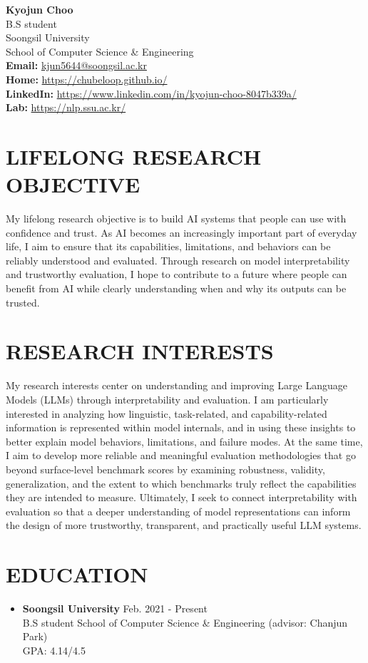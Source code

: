 \documentclass[10pt,a4paper]{article} %
\newcommand{\seclabel}[1]{\section*{\uppercase{#1}}}
\newcommand{\cvitem}[2]{\textbf{#1} \hfill \small{#2}\\}
\begin{document}
\begin{center}
    \textbf{\Huge{Kyojun Choo}} \\ \vspace{1.0em}
    B.S student \\ Soongsil University \\ School of Computer Science \& Engineering \\
    \textbf{Email: }\href{mailto:kjun5644@soongsil.ac.kr}{kjun5644@soongsil.ac.kr} \\
    \textbf{Home: }\url{https://chubeloop.github.io/} \\
    \textbf{LinkedIn: }\url{https://www.linkedin.com/in/kyojun-choo-8047b339a/} \\
    \textbf{Lab: }\url{https://nlp.ssu.ac.kr/}
\end{center}

\vspace{1em}

\seclabel{Lifelong Research Objective}
\small{My lifelong research objective is to build AI systems that people can use with confidence and trust. As AI becomes an increasingly important part of everyday life, I aim to ensure that its capabilities, limitations, and behaviors can be reliably understood and evaluated. Through research on model interpretability and trustworthy evaluation, I hope to contribute to a future where people can benefit from AI while clearly understanding when and why its outputs can be trusted.}

\seclabel{Research Interests}
\small{My research interests center on understanding and improving Large Language Models (LLMs) through interpretability and evaluation. I am particularly interested in analyzing how linguistic, task-related, and capability-related information is represented within model internals, and in using these insights to better explain model behaviors, limitations, and failure modes. At the same time, I aim to develop more reliable and meaningful evaluation methodologies that go beyond surface-level benchmark scores by examining robustness, validity, generalization, and the extent to which benchmarks truly reflect the capabilities they are intended to measure. Ultimately, I seek to connect interpretability with evaluation so that a deeper understanding of model representations can inform the design of more trustworthy, transparent, and practically useful LLM systems.}

\seclabel{Education}
\begin{itemize}[left=0pt]
    \item \cvitem{Soongsil University}{\small{Feb. 2021 - Present}}
    \small{B.S student School of Computer Science \& Engineering (advisor: Chanjun Park) \\
    \small{GPA: 4.14/4.5}}
\end{itemize}
\end{document}
